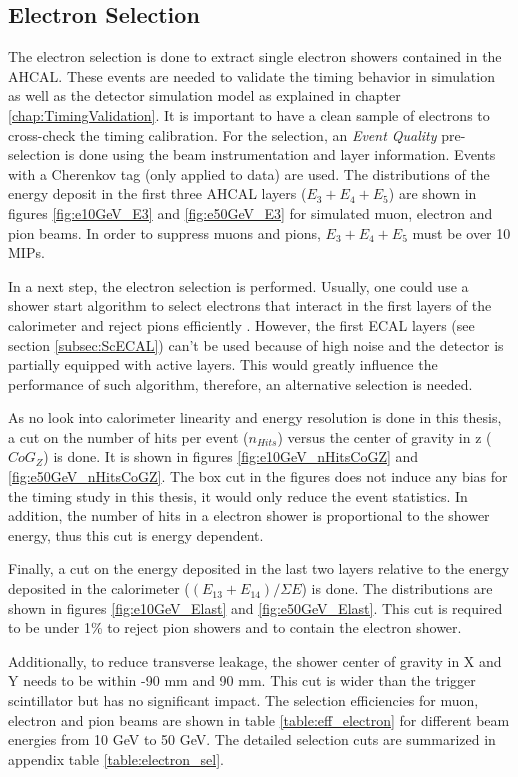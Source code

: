 \subsection{Electron Selection}
\label{subsec:elec_sel}

The electron selection is done to extract single electron showers contained in the AHCAL. These events are needed to validate the timing behavior in simulation as well as the detector simulation model as explained in chapter \ref{chap:TimingValidation}. It is important to have a clean sample of electrons to cross-check the timing calibration. For the selection, an \textit{Event Quality} pre-selection is done using the beam instrumentation and layer information. Events with a Cherenkov tag (only applied to data) are used. The distributions of the energy deposit in the first three AHCAL layers ($E_3+E_4+E_5$) are shown in figures \ref{fig:e10GeV_E3} and \ref{fig:e50GeV_E3} for simulated muon, electron and pion beams. In order to suppress muons and pions, $E_3+E_4+E_5$ must be over 10 MIPs.

In a next step, the electron selection is performed. Usually, one could use a shower start algorithm to select electrons that interact in the first layers of the calorimeter and reject pions efficiently \cite{Hartbrich:2016bbz}. However, the first ECAL layers (see section \ref{subsec:ScECAL}) can't be used because of high noise and the detector is partially equipped with active layers. This would greatly influence the performance of such algorithm, therefore, an alternative selection is needed.

As no look into calorimeter linearity and energy resolution is done in this thesis, a cut on the number of hits per event ($n_{Hits}$) versus the center of gravity in z ($CoG_Z$) is done. It is shown in figures \ref{fig:e10GeV_nHitsCoGZ} and \ref{fig:e50GeV_nHitsCoGZ}. The box cut in the figures does not induce any bias for the timing study in this thesis, it would only reduce the event statistics. In addition, the number of hits in a electron shower is proportional to the shower energy, thus this cut is energy dependent.

Finally, a cut on the energy deposited in the last two layers relative to the energy deposited in the calorimeter ($(E_{13}+E_{14})/\Sigma E$) is done. The distributions are shown in figures \ref{fig:e10GeV_Elast} and \ref{fig:e50GeV_Elast}. This cut is required to be under 1\% to reject pion showers and to contain the electron shower.

Additionally, to reduce transverse leakage, the shower center of gravity in X and Y needs to be within -90 mm and 90 mm. This cut is wider than the trigger scintillator but has no significant impact. The selection efficiencies for muon, electron and pion beams are shown in table \ref{table:eff_electron} for different beam energies from 10 GeV to 50 GeV. The detailed selection cuts are summarized in appendix table \ref{table:electron_sel}.

